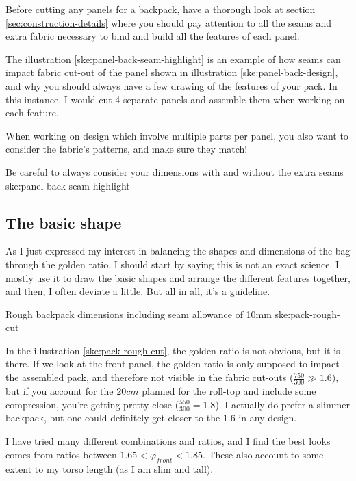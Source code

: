 Before cutting any panels for a backpack, have a thorough look at section \ref{sec:construction-details} where you should pay attention to all the seams and extra fabric necessary to bind and build all the features of each panel.

The illustration \ref{ske:panel-back-seam-highlight} is an example of how seams can impact fabric cut-out of the panel shown in illustration \ref{ske:panel-back-design}, and why you should always have a few drawing of the features of your pack. In this instance, I would cut 4 separate panels and assemble them when working on each feature.

\begin{note}
  When working on design which involve multiple parts per panel, you also want to consider the fabric's patterns, and make sure they match!
\end{note}

{Be careful to always consider your dimensions with and without the extra seams}
{ske:panel-back-seam-highlight}

\subsection{The basic shape}

As I just expressed my interest in balancing the shapes and dimensions of the bag through the golden ratio, I should start by saying this is not an exact science. I mostly use it to draw the basic shapes and arrange the different features together, and then, I often deviate a little. But all in all, it's a guideline.

{Rough backpack dimensions including seam allowance of 10mm}
{ske:pack-rough-cut}

In the illustration \ref{ske:pack-rough-cut}, the golden ratio is not obvious, but it is there. If we look at the front panel, the golden ratio is only supposed to impact the assembled pack, and therefore not visible in the fabric cut-outs ($\frac{750}{300} \gg 1.6$), but if you account for the $20cm$ planned for the roll-top and include some compression, you're getting pretty close ($\frac{550}{300} = 1.8$). I actually do prefer a slimmer backpack, but one could definitely get closer to the $1.6$ in any design.

I have tried many different combinations and ratios, and I find the best looks comes from ratios between $1.65 < \varphi_{front} < 1.85$. These also account to some extent to my torso length (as I am slim and tall).

